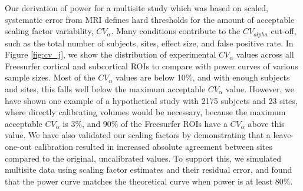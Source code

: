 Our derivation of power for a multisite study which was based on scaled, systematic error from MRI defines hard thresholds for the amount of acceptable scaling factor variability, $CV_{\alpha}$. Many conditions contribute to the $CV_{alpha}$ cut-off, such as the total number of subjects, sites, effect size, and false positive rate. In Figure \ref{fig:cv_j}, we show the distribution of experimental $CV_{\alpha}$ values across all Freesurfer cortical and subcortical ROIs to compare with power curves of various sample sizes. Most of the $CV_{\alpha}$ values are below 10\%, and with enough subjects and sites, this falls well below the maximum acceptable $CV_{\alpha}$ value. However, we have shown one example of a hypothetical study with 2175 subjects and 23 sites, where directly calibrating volumes would be necessary, because the maximum acceptable $CV_{\alpha}$ is 3\%, and 90\% of the Freesurfer ROIs have a $CV_{\alpha}$ above this value. We have also validated our scaling factors by demonstrating that a leave-one-out calibration resulted in increased absolute agreement between sites compared to the original, uncalibrated values. To support this, we simulated multisite data using scaling factor estimates and their residual error, and found that the power curve matches the theoretical curve when power is at least 80\%.